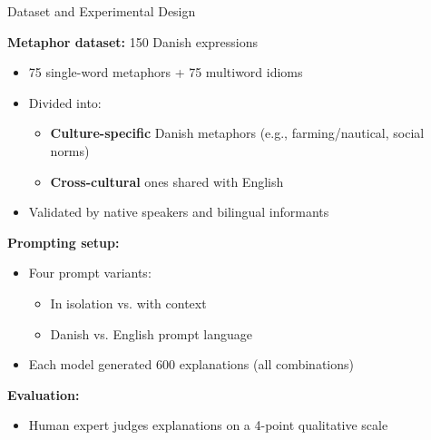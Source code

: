 \documentclass[xetex]{beamer}
\begin{document}
\begin{frame}{Dataset and Experimental Design}

  \textbf{Metaphor dataset:} 150 Danish expressions
  \begin{itemize}
  \item 75 single-word metaphors + 75 multiword idioms 
  \item Divided into:
    \begin{itemize}
    \item \textbf{Culture-specific} Danish metaphors (e.g., farming/nautical, social norms)
    \item \textbf{Cross-cultural} ones shared with English
    \end{itemize}
  \item Validated by native speakers and bilingual informants
  \end{itemize}

\medskip
\textbf{Prompting setup:}
\begin{itemize}
\item Four prompt variants:
  \begin{itemize}
  \item In isolation vs. with context
  \item Danish vs. English prompt language
  \end{itemize}
\item Each model generated 600 explanations (all combinations)
\end{itemize}

\medskip
\textbf{Evaluation:}
\begin{itemize}
  \item Human expert judges explanations on a 4-point qualitative scale
\end{itemize}

\end{frame}
\end{document}
